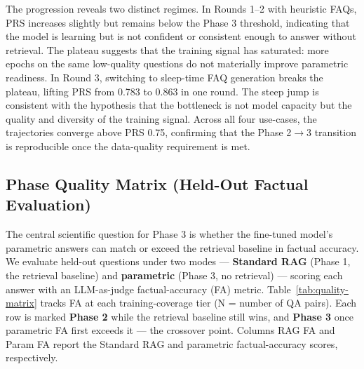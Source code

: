 \documentclass[10pt,twocolumn]{article}
\begin{document}
The progression reveals two distinct regimes. In Rounds 1--2 with heuristic FAQs, PRS increases slightly but remains below the Phase 3 threshold, indicating that the model is learning but is not confident or consistent enough to answer without retrieval. The plateau suggests that the training signal has saturated: more epochs on the same low-quality questions do not materially improve parametric readiness. In Round 3, switching to sleep-time FAQ generation breaks the plateau, lifting PRS from 0.783 to 0.863 in one round. The steep jump is consistent with the hypothesis that the bottleneck is not model capacity but the quality and diversity of the training signal. Across all four use-cases, the trajectories converge above PRS 0.75, confirming that the Phase 2$\to$3 transition is reproducible once the data-quality requirement is met.


\subsection{Phase Quality Matrix (Held-Out Factual Evaluation)}

The central scientific question for Phase 3 is whether the fine-tuned model's parametric answers can match or exceed the retrieval baseline in factual accuracy. We evaluate held-out questions under two modes --- \textbf{Standard RAG} (Phase 1, the retrieval baseline) and \textbf{parametric} (Phase 3, no retrieval) --- scoring each answer with an LLM-as-judge factual-accuracy (FA) metric. Table~\ref{tab:quality-matrix} tracks FA at each training-coverage tier (N = number of QA pairs). Each row is marked \textbf{Phase 2} while the retrieval baseline still wins, and \textbf{Phase 3} once parametric FA first exceeds it --- the crossover point. Columns RAG FA and Param FA report the Standard RAG and parametric factual-accuracy scores, respectively.
\end{document}
